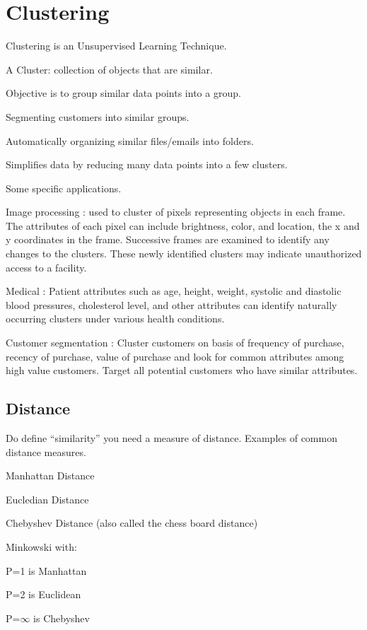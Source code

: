 	\section{Clustering}
	\begin{bulletedlist}
		\item Clustering is an Unsupervised Learning Technique.
		\item A Cluster: collection of objects that are similar.
		\item Objective is to group similar data points into a group.
		\begin{bulletedlist}
			\item Segmenting customers into similar groups.
			\item Automatically organizing similar files/emails into folders.
		\end{bulletedlist}
		\item Simplifies data by reducing many data points into a few clusters.
		\item Some specific applications.
		\begin{bulletedlist}
			\item Image processing : used to cluster of pixels representing objects in each frame. The attributes of each pixel can include brightness, color, and location, the x and y
coordinates in the frame. Successive frames are examined to identify any changes to the clusters. These newly identified clusters may indicate unauthorized access to a facility.
			\item Medical : Patient attributes such as age, height, weight, systolic and diastolic blood pressures, cholesterol level, and other attributes can identify naturally occurring clusters under various health conditions.
			\item Customer segmentation : Cluster customers on basis of frequency of purchase, recency of purchase, value of purchase and look for common attributes among high value customers. Target all potential customers who have similar attributes.
		\end{bulletedlist}
	\end{bulletedlist}

	\subsection{Distance}
Do define ``similarity'' you need a measure of distance.  Examples of common distance measures.
	\begin{bulletedlist}
		\item Manhattan Distance
		\item Eucledian Distance
		\item Chebyshev Distance (also called the chess board distance)
		\item Minkowski with:
		\begin{bulletedlist}
			\item P=1 is Manhattan
			\item P=2 is Euclidean
			\item P=$\infty$ is Chebyshev
		\end{bulletedlist}
	\end{bulletedlist}

